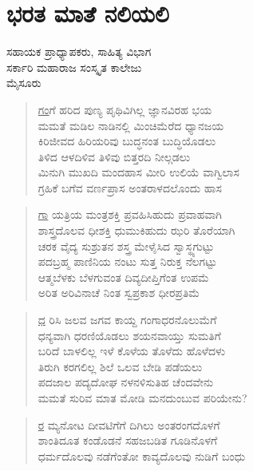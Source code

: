 {\fontsize{14}{16}\selectfont
\chapter{ಭರತ ಮಾತೆ ನಲಿಯಲಿ}

\begin{center}
\smallskip
ಸಹಾಯಕ ಪ್ರಾಧ್ಯಾಪಕರು, ಸಾಹಿತ್ಯ ವಿಭಾಗ \\
ಸರ್ಕಾರಿ ಮಹಾರಾಜ ಸಂಸ್ಕೃತ ಕಾಲೇಜು \\
ಮೈಸೂರು
\addrule
\end{center}
\begin{verse}
\underline{ಗಂ}ಗೆ ಹರಿದ ಪುಣ್ಯ ಪೃಥಿವಿಗಿಲ್ಲ ಜ್ಞಾನವಿರಹ ಭಯ\\
ಮಮತೆ ಮಡಿಲ ನಾಡಿನಲ್ಲಿ ಮಿಂಚಿಮೆರೆದ ಧ್ಯಾನಜಯ\\
ಕಿರಿಜೀವದ ಹಿರಿಯರಿವು ಬುದ್ಧನಂತ ಬುದ್ಧಿಯೊಡಲು\\
ತಿಳಿದ ಆಳದಿಳಿವ ತಿಳಿವು ಬಿತ್ತರದಿ ನೀಲ್ಗಡಲು\\
ಮಿನುಗಿ ಮುಖದಿ ಮಂದಹಾಸ ಮೀರಿ ಉಲಿಯೆ ವಾಗ್ವಿಲಾಸ\\
ಗ್ರಹಿಕೆ ಬಗೆವ ವರ್ಣಪ್ರಾಸ ಅಂತರಾಳದಲೊಂದು ಹಾಸ
\end{verse}
\begin{verse}
\underline{ಗಾ} ಯತ್ರಿಯ ಮಂತ್ರಶಕ್ತಿ ಪ್ರವಹಿಸಿಹುದು ಪ್ರವಾಹವಾಗಿ\\
ಶಾಸ್ತ್ರದೊಲವ ಧೀಶಕ್ತಿ ಧುಮುಕಿಹುದು ಝರಿ  \enginline{-}  ತೊರೆಯಾಗಿ\\
ಚರಕ ವೈದ್ಯ ಸುಶ್ರುತನ ಶಸ್ತ್ರ ಮೇಳೈಸಿದ ಸ್ವಾಸ್ಥ್ಯಗುಟ್ಟು\\
ಪದಬ್ರಹ್ಮ ಪಾಣಿನಿಯ ನಂಟು ಸುತ್ತ ನಿರುಕ್ತ ನೆಲಗಟ್ಟು\\
ಆತ್ಮಬೆಳಕು ಬೆಳಗುವಂತ ದಿವ್ಯದೀಪ್ತಿಗೆಂತ ಉಪಮೆ\\
ಅರಿತ ಅರಿವಿನಾಚೆ ನಿಂತ ಸ್ವಪ್ರಕಾಶ ಧೀರಪ್ರತಿಮೆ
\end{verse}
\begin{verse}
\underline{ಧ} ರಿಸಿ ಜಲವ ಜಗವ ಕಾಯ್ದ ಗಂಗಾಧರನೊಲುಮೆಗೆ\\
ಧನ್ಯವಾಗಿ ಧರಣಿಯೊಡಲು ಶಯನವಾಯ್ತು ಸುಮತಿಗೆ\\
ಬರಿದೆ ಬಾಳಲಿಲ್ಲ ಇಳೆ ಕೊಳೆಯ ತೊಳೆದು ಹೊಳೆದಳು\\
ತಿರುಗಿ ಕರಗಲಿಲ್ಲ ಶಿಲೆ ಒಲವ ಬೇಡಿ ಪಡೆಯಲು\\
ಪದಜಾಲ ಪದ್ಯದೋಘ ನಳನಳಿಸುತಿಹ ಚೆಂದವೇನು\\
ಮಮತೆ ಸುರಿವ ಮಾತ ಮೋಡಿ ಮನದುಂಬುವ ಪರಿಯೇನು?
\end{verse}
\begin{verse}
\underline{ರ} ಮ್ಯನೋಟ ದೀವಟಿಗೆಗೆ ದಿಗಿಲು ಅಂತರಂಗದೊಳಗೆ\\
ಶಾಂತಿದೂತ ಕಂಡೊಡನೆ ಸಹಜಬಡಿತ ಗೂಡಿನೊಳಗೆ\\
ಧರ್ಮದೊಲವು ನಡೆಗೆಂತೋ ಕಾವ್ಯದೊಲವು ನುಡಿಗೆ ಬಂಧು\\

\end{verse}}
